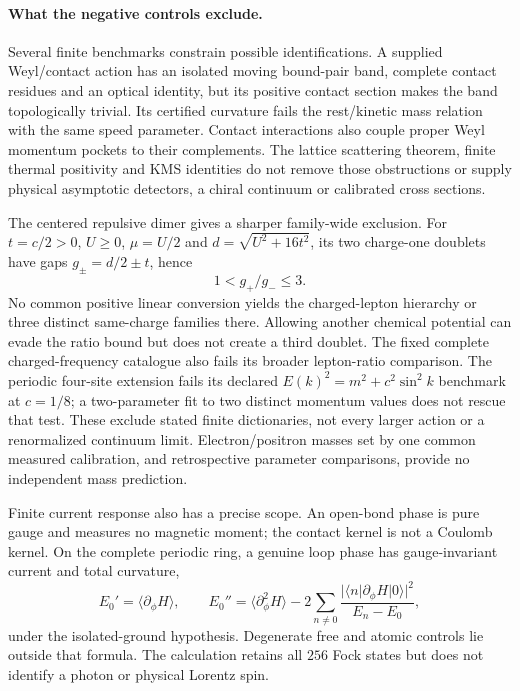 \paragraph{What the negative controls exclude.}
Several finite benchmarks constrain possible identifications.
A supplied Weyl/contact action has an isolated moving bound-pair band,
complete contact residues and an optical identity, but its positive
contact section makes the band topologically trivial. Its certified
curvature fails the rest/kinetic mass relation with the same speed
parameter. Contact interactions also couple proper Weyl momentum pockets
to their complements. The lattice scattering theorem, finite thermal
positivity and KMS identities do not remove those obstructions or supply
physical asymptotic detectors, a chiral continuum or calibrated cross sections.

The centered repulsive dimer gives a sharper family-wide exclusion.
For $t=c/2>0$, $U\ge0$, $\mu=U/2$ and $d=\sqrt{U^2+16t^2}$, its two
charge-one doublets have gaps $g_\pm=d/2\pm t$, hence
\[
 1<g_+/g_-\le3.
\]
No common positive linear conversion yields the charged-lepton hierarchy
or three distinct same-charge families there. Allowing another chemical
potential can evade the ratio bound but does not create a third doublet.
The fixed complete charged-frequency catalogue also fails its broader
lepton-ratio comparison. The periodic four-site extension fails its
declared $E(k)^2=m^2+c^2\sin^2k$ benchmark at $c=1/8$; a two-parameter
fit to two distinct momentum values does not rescue that test.
These exclude stated finite dictionaries, not every larger action or a
renormalized continuum limit. Electron/positron masses set by one common
measured calibration, and retrospective parameter comparisons, provide
no independent mass prediction.

Finite current response also has a precise scope. An open-bond phase is
pure gauge and measures no magnetic moment; the contact kernel is not
a Coulomb kernel. On the complete periodic ring, a genuine loop phase
has gauge-invariant current and total curvature,
\[
 E_0'=\langle\partial_\phi H\rangle,\qquad
 E_0''=\langle\partial_\phi^2H\rangle
 -2\sum_{n\ne0}\frac{|\langle n|\partial_\phi H|0\rangle|^2}{E_n-E_0},
\]
under the isolated-ground hypothesis. Degenerate free and atomic controls
lie outside that formula. The calculation retains all $256$ Fock states
but does not identify a photon or physical Lorentz spin.

